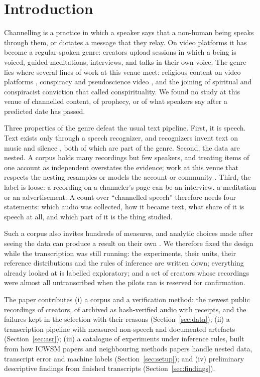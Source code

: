 \documentclass[letterpaper]{article} %
\begin{document}
\section{Introduction}

Channelling is a practice in which a speaker says that a non-human being speaks through them, or dictates a message that they relay. On video platforms it has become a regular spoken genre: creators upload sessions in which a being is voiced, guided meditations, interviews, and talks in their own voice. The genre lies where several lines of work at this venue meet: religious content on video platforms \cite{chen2025digital}, conspiracy and pseudoscience video \cite{liaw2023younicon,papadamou2020flu}, and the joining of spiritual and conspiracist conviction that \citet{ward2011emergence} called conspirituality. We found no study at this venue of channelled content, of prophecy, or of what speakers say after a predicted date has passed.

Three properties of the genre defeat the usual text pipeline. First, it is speech. Text exists only through a speech recognizer, and recognizers invent text on music and silence \cite{koenecke2024careless,baranski2025investigation}, both of which are part of the genre. Second, the data are nested. A corpus holds many recordings but few speakers, and treating items of one account as independent overstates the evidence; work at this venue that respects the nesting resamples or models the account or community \cite{zhang2017community,hu2022quotatives,colglazier2024effects}. Third, the label is loose: a recording on a channeler's page can be an interview, a meditation or an advertisement. A count over ``channelled speech'' therefore needs four statements: which audio was collected, how it became text, what share of it is speech at all, and which part of it is the thing studied.

Such a corpus also invites hundreds of measures, and analytic choices made after seeing the data can produce a result on their own \cite{simonsohn2020specification,delgiudice2021traveler}. We therefore fixed the design while the transcription was still running: the experiments, their units, their reference distributions and the rules of inference are written down; everything already looked at is labelled exploratory; and a set of creators whose recordings were almost all untranscribed when the pilots ran is reserved for confirmation.

The paper contributes (i) a corpus and a verification method: the newest \NPerCreator{} public recordings of \NCreators{} creators, \NArchived{} of \NSelected{} archived as hash-verified audio with receipts, and the \NFailed{} failures kept in the selection with their reasons (Section~\ref{sec:data}); (ii) a transcription pipeline with measured non-speech and documented artefacts (Section~\ref{sec:asr}); (iii) a catalogue of \NExperiments{} experiments under \NRules{} inference rules, built from how ICWSM papers and neighbouring methods papers handle nested data, transcript error and machine labels (Section~\ref{sec:setup}); and (iv) preliminary descriptive findings from \SnapLines{} finished transcripts (Section~\ref{sec:findings}).
\end{document}
